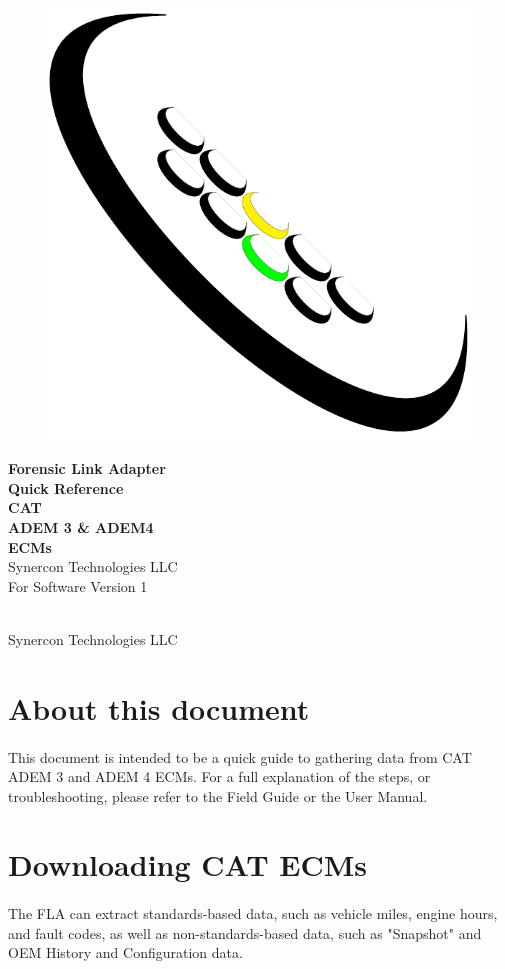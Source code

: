 \documentclass[11pt]{article}
\newcommand*{\titleGP}{\begingroup %
\centering %
\vspace*{\baselineskip} %
\begin{figure}[tbph]
\centering
\includegraphics[width=0.15\linewidth]{../media/logos/synercon_logo_v3_only}
\end{figure}
{\Huge \textbf{Forensic Link Adapter \\Quick Reference}}\\[2\baselineskip] %
{\Huge \textbf{CAT \\ADEM 3 \& ADEM4 \\[.4cm] ECMs}}\\[2\baselineskip] %
{\Huge Synercon Technologies LLC}\\[2\baselineskip]
{\Large For Software Version 1}\\[3cm]

\tableofcontents
\vfill %


\textcopyright {\scshape 2015} \\[0.3\baselineskip] %
Synercon Technologies LLC

\endgroup}
\begin{document}







\titleGP %

\newpage
\section{About this document}
\paragraph{  }
This document is intended to be a quick guide to gathering data from CAT ADEM 3 and ADEM 4 ECMs. For a full explanation of the steps, or troubleshooting, please refer to the Field Guide or the User Manual.

\section{Downloading CAT ECMs}
\paragraph{  }
The FLA can extract standards-based data, such as vehicle miles, engine hours, and fault codes, as well as non-standards-based data, such as "Snapshot" and OEM History and Configuration data.
\end{document}

